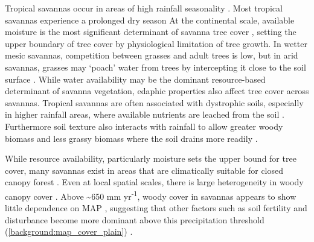 \begin{refsection}
Tropical savannas occur in areas of high rainfall seasonality \citep{Lehmann2011}. Most tropical savannas experience a prolonged dry season At the continental scale, available moisture is the most significant determinant of savanna tree cover \citep{Sankaran2005}, setting the upper boundary of tree cover by physiological limitation of tree growth. In wetter mesic savannas, competition between grasses and adult trees is low, but in arid savannas, grasses may `poach' water from trees by intercepting it close to the soil surface \citep{Scheiter2007}. While water availability may be the dominant resource-based determinant of savanna vegetation, edaphic properties also affect tree cover across savannas. Tropical savannas are often associated with dystrophic soils, especially in higher rainfall areas, where available nutrients are leached from the soil \citep{February2013}. Furthermore soil texture also interacts with rainfall to allow greater woody biomass and less grassy biomass where the soil drains more readily \citep{Staver2011}. 

While resource availability, particularly moisture sets the upper bound for tree cover, many savannas exist in areas that are climatically suitable for closed canopy forest \citep{Sankaran2005, Lehmann2011, Staver2011, Murphy2012}. Even at local spatial scales, there is large heterogeneity in woody canopy cover \citep{Dantas2015}. Above \textasciitilde{}650 mm yr\textsuperscript{-1}, woody cover in savannas appears to show little dependence on MAP \citep{Sankaran2008, Sankaran2005, Good2011}, suggesting that other factors such as soil fertility and disturbance become more dominant above this precipitation threshold (\autoref{background:map_cover_plain}) \citep{Staver2011}. 


\end{refsection}
